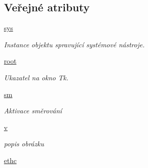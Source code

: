 \subsection*{Veřejné atributy}
\begin{DoxyCompactItemize}
\item 
\hypertarget{classcloseSetup_1_1App_a29e3a5f52ef638873f13f1e1dc3b03f2}{\hyperlink{classcloseSetup_1_1App_a29e3a5f52ef638873f13f1e1dc3b03f2}{sys}}\label{df/df9/classcloseSetup_1_1App_a29e3a5f52ef638873f13f1e1dc3b03f2}

\begin{DoxyCompactList}\small\item\em Instance objektu spravující systémové nástroje. \end{DoxyCompactList}\item 
\hypertarget{classcloseSetup_1_1App_aa89fd74d63463734d14e222fe2296815}{\hyperlink{classcloseSetup_1_1App_aa89fd74d63463734d14e222fe2296815}{root}}\label{df/df9/classcloseSetup_1_1App_aa89fd74d63463734d14e222fe2296815}

\begin{DoxyCompactList}\small\item\em Ukazatel na okno Tk. \end{DoxyCompactList}\item 
\hypertarget{classcloseSetup_1_1App_a5e7484b9da3c7ae7afe40b188427fc9c}{\hyperlink{classcloseSetup_1_1App_a5e7484b9da3c7ae7afe40b188427fc9c}{sm}}\label{df/df9/classcloseSetup_1_1App_a5e7484b9da3c7ae7afe40b188427fc9c}

\begin{DoxyCompactList}\small\item\em Aktivace směrování \end{DoxyCompactList}\item 
\hypertarget{classcloseSetup_1_1App_a5c27a170502be05b69f25e5e2bd05ef5}{\hyperlink{classcloseSetup_1_1App_a5c27a170502be05b69f25e5e2bd05ef5}{v}}\label{df/df9/classcloseSetup_1_1App_a5c27a170502be05b69f25e5e2bd05ef5}

\begin{DoxyCompactList}\small\item\em popis obrázku \end{DoxyCompactList}\item 
\hypertarget{classcloseSetup_1_1App_a8d30b3f58f498caf6da5a5df32f8b24a}{\hyperlink{classcloseSetup_1_1App_a8d30b3f58f498caf6da5a5df32f8b24a}{ethc}}\label{df/df9/classcloseSetup_1_1App_a8d30b3f58f498caf6da5a5df32f8b24a}


\end{DoxyCompactItemize}
